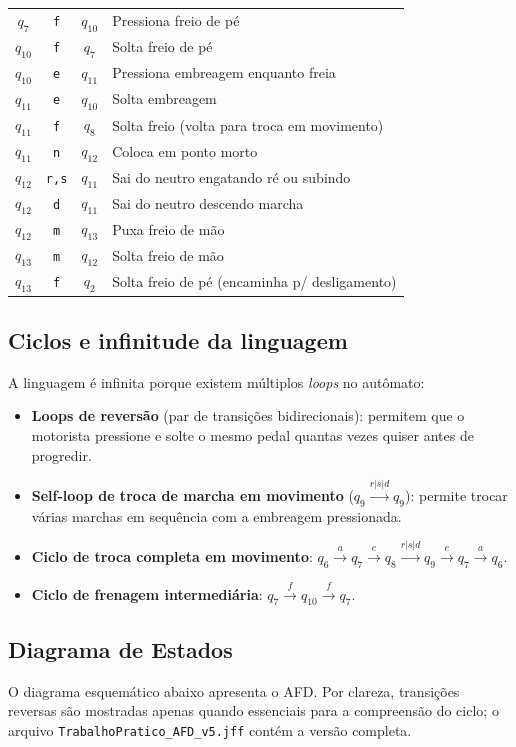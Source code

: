 \documentclass[12pt,a4paper]{article}
\begin{document}
\begin{center}
\begin{longtable}{|c|c|c|l|}
    $q_7$    & \texttt{f} & $q_{10}$ & Pressiona freio de pé \\
    $q_{10}$ & \texttt{f} & $q_7$    & Solta freio de pé \\
    $q_{10}$ & \texttt{e} & $q_{11}$ & Pressiona embreagem enquanto freia \\
    $q_{11}$ & \texttt{e} & $q_{10}$ & Solta embreagem \\
    $q_{11}$ & \texttt{f} & $q_8$    & Solta freio (volta para troca em movimento) \\
    $q_{11}$ & \texttt{n} & $q_{12}$ & Coloca em ponto morto \\
    $q_{12}$ & \texttt{r,s} & $q_{11}$ & Sai do neutro engatando ré ou subindo \\
    $q_{12}$ & \texttt{d} & $q_{11}$ & Sai do neutro descendo marcha \\
    $q_{12}$ & \texttt{m} & $q_{13}$ & Puxa freio de mão \\
    $q_{13}$ & \texttt{m} & $q_{12}$ & Solta freio de mão \\
    $q_{13}$ & \texttt{f} & $q_2$    & Solta freio de pé (encaminha p/ desligamento) \\
    \hline
\end{longtable}
\end{center}

\subsection{Ciclos e infinitude da linguagem}
A linguagem é infinita porque existem múltiplos \emph{loops} no autômato:
\begin{itemize}
    \item \textbf{Loops de reversão} (par de transições bidirecionais): permitem que o motorista pressione e solte o mesmo pedal quantas vezes quiser antes de progredir.
    \item \textbf{Self-loop de troca de marcha em movimento} ($q_9 \xrightarrow{r|s|d} q_9$): permite trocar várias marchas em sequência com a embreagem pressionada.
    \item \textbf{Ciclo de troca completa em movimento}:
    $q_6 \xrightarrow{a} q_7 \xrightarrow{e} q_8 \xrightarrow{r|s|d} q_9 \xrightarrow{e} q_7 \xrightarrow{a} q_6$.
    \item \textbf{Ciclo de frenagem intermediária}:
    $q_7 \xrightarrow{f} q_{10} \xrightarrow{f} q_7$.
\end{itemize}

\subsection{Diagrama de Estados}
O diagrama esquemático abaixo apresenta o AFD. Por clareza, transições reversas são mostradas apenas quando essenciais para a compreensão do ciclo; o arquivo \texttt{TrabalhoPratico\_AFD\_v5.jff} contém a versão completa.
\end{document}
